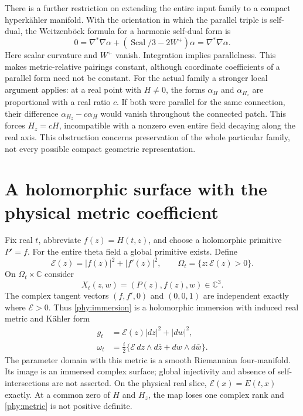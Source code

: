 \documentclass[11pt]{article}
\numberwithin{equation}{section}
\theoremstyle{definition}
\theoremstyle{remark}
\begin{document}
There is a further restriction on extending the entire input family to
a compact hyperk\"ahler manifold.  With the orientation in which the
parallel triple is self-dual, the Weitzenb\"ock formula for a harmonic
self-dual form is
\[
 0=\nabla^*\nabla\alpha+
       (\operatorname{Scal}/3-2W^+)\alpha=\nabla^*\nabla\alpha.
\]
Here scalar curvature and $W^+$ vanish.  Integration implies
parallelness.  This makes metric-relative pairings constant, although
coordinate coefficients of a parallel form need not be constant.
For the actual family a stronger local argument applies: at a real
point with $H\ne0$, the forms $\alpha_H$ and $\alpha_{H_z}$ are
proportional with a real ratio $c$.  If both were parallel for the same
connection, their difference $\alpha_{H_z}-c\alpha_H$ would vanish
throughout the connected patch.  This forces $H_z=cH$, incompatible
with a nonzero even entire field decaying along the real axis.  This
obstruction concerns preservation of the whole particular family, not
every possible compact geometric representation.

\section{A holomorphic surface with the physical metric coefficient}
\label{phy:jet-surface}

Fix real $t$, abbreviate $f(z)=H(t,z)$, and choose a holomorphic primitive
$P'=f$.  For the entire theta field a global primitive exists.  Define
\[
 \mathcal E(z)=|f(z)|^2+|f'(z)|^2,\qquad
 \Omega_t=\{z:\mathcal E(z)>0\}.
\]
On $\Omega_t\times\mathbb C$ consider
\begin{equation}
 X_t(z,w)=(P(z),f(z),w)\in\mathbb C^3.
 \label{phy:immersion}
\end{equation}
The complex tangent vectors $(f,f',0)$ and $(0,0,1)$ are independent
exactly where $\mathcal E>0$.  Thus \eqref{phy:immersion} is a holomorphic
immersion with induced real metric and Kähler form
\begin{align}
 g_t&=\mathcal E(z)|dz|^2+|dw|^2,
 \label{phy:metric}\\
 \omega_t&=\frac{i}{2}
    \{\mathcal E\,dz\wedge d\bar z+dw\wedge d\bar w\}.
 \label{phy:kahler-form}
\end{align}
The parameter domain with this metric is a smooth Riemannian four-manifold.
Its image is an immersed complex surface; global injectivity and absence
of self-intersections are not asserted.  On the physical real slice,
$\mathcal E(x)=E(t,x)$ exactly.  At a common zero of $H$ and $H_z$, the
map loses one complex rank and \eqref{phy:metric} is not positive definite.
\end{document}

